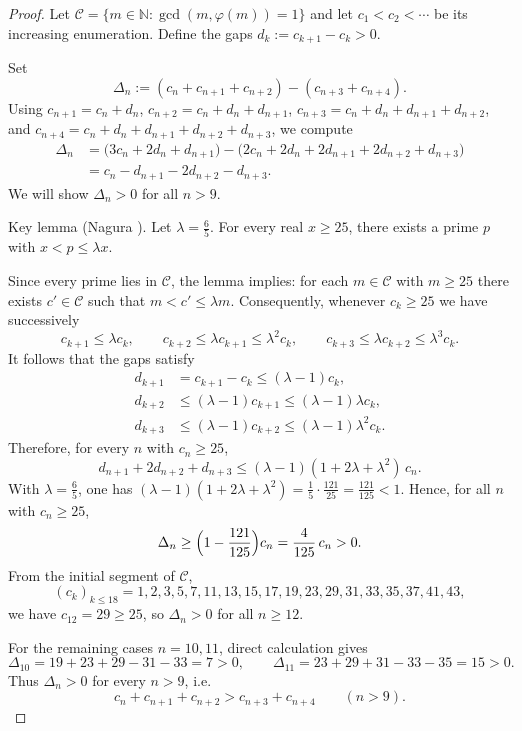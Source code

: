 \documentclass[12pt]{article}
\theoremstyle{remark}
\begin{document}
\begin{proof}
Let $\mathcal C=\{m\in\mathbb N: \gcd(m,\varphi(m))=1\}$ and let $c_1<c_2<\cdots$ be its increasing enumeration. Define the gaps $d_k:=c_{k+1}-c_k>0$.

Set
$$
\Delta_n:=(c_n+c_{n+1}+c_{n+2})-(c_{n+3}+c_{n+4}).
$$
Using $c_{n+1}=c_n+d_n$, $c_{n+2}=c_n+d_n+d_{n+1}$, $c_{n+3}=c_n+d_n+d_{n+1}+d_{n+2}$, and $c_{n+4}=c_n+d_n+d_{n+1}+d_{n+2}+d_{n+3}$, we compute
\[
\begin{aligned}
\Delta_n&=\bigl(3c_n+2d_n+d_{n+1}\bigr)-\bigl(2c_n+2d_n+2d_{n+1}+2d_{n+2}+d_{n+3}\bigr)\\
&=c_n-d_{n+1}-2d_{n+2}-d_{n+3}.
\end{aligned}
\]
We will show $\Delta_n>0$ for all $n>9$.

Key lemma (Nagura \cite{Nagura1952}). Let $\lambda=\tfrac65$. For every real $x\ge25$, there exists a prime $p$ with $x<p\le\lambda x$.

Since every prime lies in $\mathcal C$, the lemma implies: for each $m\in\mathcal C$ with $m\ge25$ there exists $c'\in\mathcal C$ such that $m<c'\le\lambda m$. Consequently, whenever $c_k\ge25$ we have successively
$$
 c_{k+1}\le\lambda c_k,\qquad c_{k+2}\le\lambda c_{k+1}\le\lambda^2 c_k,\qquad c_{k+3}\le\lambda c_{k+2}\le\lambda^3 c_k.
$$
It follows that the gaps satisfy
\[
\begin{aligned}
 d_{k+1} &= c_{k+1}-c_k \le (\lambda-1)c_k,\\
 d_{k+2} &\le (\lambda-1)c_{k+1} \le (\lambda-1)\lambda c_k,\\
 d_{k+3} &\le (\lambda-1)c_{k+2} \le (\lambda-1)\lambda^2 c_k.
\end{aligned}
\]
Therefore, for every $n$ with $c_n\ge25$,
$$
 d_{n+1}+2d_{n+2}+d_{n+3}\le(\lambda-1)(1+2\lambda+\lambda^2)\,c_n.
$$
With $\lambda=\tfrac65$, one has $(\lambda-1)(1+2\lambda+\lambda^2)=\tfrac{1}{5}\cdot\tfrac{121}{25}=\tfrac{121}{125}<1$. Hence, for all $n$ with $c_n\ge25$,
$$
\Delta_n\ge\Bigl(1-\frac{121}{125}\Bigr)c_n=\frac{4}{125}\,c_n>0.
$$
From the initial segment of $\mathcal C$,
$$
(c_k)_{k\le 18}=1,2,3,5,7,11,13,15,17,19,23,29,31,33,35,37,41,43,
$$
we have $c_{12}=29\ge25$, so $\Delta_n>0$ for all $n\ge12$.

For the remaining cases $n=10,11$, direct calculation gives
$$
\Delta_{10}=19+23+29-31-33=7>0,\qquad \Delta_{11}=23+29+31-33-35=15>0.
$$
Thus $\Delta_n>0$ for every $n>9$, i.e.
$$
 c_n+c_{n+1}+c_{n+2}>c_{n+3}+c_{n+4}\qquad(n>9).
$$

\end{proof}
\end{document}
